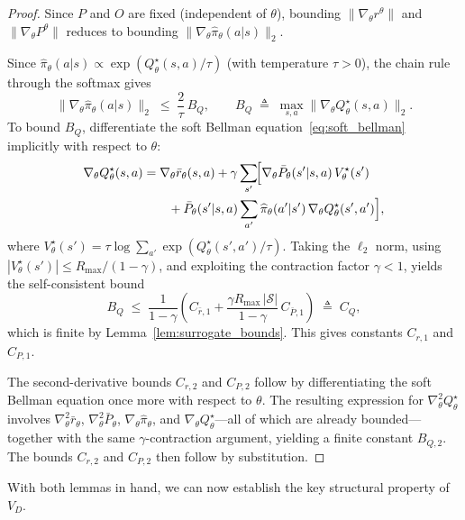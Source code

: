 \documentclass[12pt]{article}
\renewcommand{\[}{\left[}
\renewcommand{\]}{\right]}
\renewcommand{\(}{\left(}
\renewcommand{\)}{\right)}
\newcounter{l1}
\newcounter{l2}
\newcounter{l3}
\newcommand{\Rmax}{R_{\max}}
\begin{document}
\begin{proof}
Since $P$ and $O$ are fixed (independent of $\theta$), bounding
$\|\nabla_\theta r^\theta\|$ and $\|\nabla_\theta P^\theta\|$ reduces to bounding
$\|\nabla_\theta \widehat\pi_\theta(a|s)\|_2$.

Since $\widehat\pi_\theta(a|s) \propto \exp(Q^\star_\theta(s,a)/\tau)$ (with
temperature $\tau > 0$), the chain rule through the softmax gives
\begin{equation*}
  \|\nabla_\theta \widehat\pi_\theta(a|s)\|_2
  \;\le\; \frac{2}{\tau}\,B_Q,
  \qquad
  B_Q \;\triangleq\; \max_{s,a}\|\nabla_\theta Q^\star_\theta(s,a)\|_2.
\end{equation*}
To bound $B_Q$, differentiate the soft Bellman equation~\eqref{eq:soft_bellman}
implicitly with respect to $\theta$:
\begin{align*}
  \nabla_\theta Q^\star_\theta(s,a)
  &= \nabla_\theta \bar{r}_\theta(s,a)
    + \gamma\sum_{s'}\!\Bigl[
      \nabla_\theta \bar{P}_\theta(s'|s,a)\,V^\star_\theta(s')\\
    &\qquad + \bar{P}_\theta(s'|s,a)
        \sum_{a'}\widehat\pi_\theta(a'|s')\,
        \nabla_\theta Q^\star_\theta(s',a')
    \Bigr],
\end{align*}
where $V^\star_\theta(s') = \tau\log\sum_{a'}\exp(Q^\star_\theta(s',a')/\tau)$.
Taking the $\ell_2$ norm, using $|V^\star_\theta(s')| \le \Rmax/(1-\gamma)$, and
exploiting the contraction factor $\gamma < 1$, yields the self-consistent bound
\begin{equation*}
  B_Q
  \;\le\;
  \frac{1}{1-\gamma}
  \!\left(
    C_{\bar{r},1}
    + \frac{\gamma \Rmax\,|\mathcal{S}|}{1-\gamma}\,C_{\bar{P},1}
  \right)
  \;\triangleq\; C_Q,
\end{equation*}
which is finite by Lemma~\ref{lem:surrogate_bounds}. This gives constants $C_{r,1}$ and
$C_{P,1}$.

The second-derivative bounds $C_{r,2}$ and $C_{P,2}$ follow by differentiating the soft
Bellman equation once more with respect to $\theta$. The resulting expression for
$\nabla^2_\theta Q^\star_\theta$ involves $\nabla^2_\theta \bar{r}_\theta$,
$\nabla^2_\theta \bar{P}_\theta$, $\nabla_\theta \widehat\pi_\theta$, and
$\nabla_\theta Q^\star_\theta$---all of which are already bounded---together with the
same $\gamma$-contraction argument, yielding a finite constant $B_{Q,2}$. The bounds
$C_{r,2}$ and $C_{P,2}$ then follow by substitution.
\end{proof}

With both lemmas in hand, we can now establish the key structural property of $V_D$.
\end{document}
